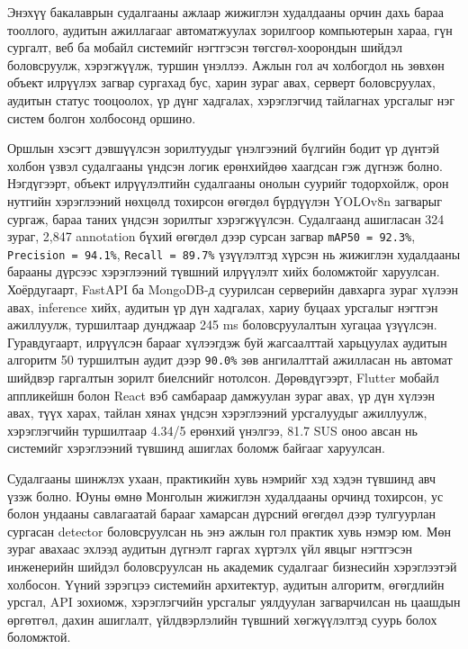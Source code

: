 
Энэхүү бакалаврын судалгааны ажлаар жижиглэн худалдааны орчин дахь бараа тооллого, аудитын ажиллагааг автоматжуулах зорилгоор компьютерын хараа, гүн сургалт, веб ба мобайл системийг нэгтгэсэн төгсгөл-хоорондын шийдэл боловсруулж, хэрэгжүүлж, туршин үнэллээ. Ажлын гол ач холбогдол нь зөвхөн объект илрүүлэх загвар сургахад бус, харин зураг авах, серверт боловсруулах, аудитын статус тооцоолох, үр дүнг хадгалах, хэрэглэгчид тайлагнах урсгалыг нэг систем болгон холбосонд оршино.

Оршлын хэсэгт дэвшүүлсэн зорилтуудыг үнэлгээний бүлгийн бодит үр дүнтэй холбон үзвэл судалгааны үндсэн логик ерөнхийдөө хаагдсан гэж дүгнэж болно. Нэгдүгээрт, объект илрүүлэлтийн судалгааны онолын суурийг тодорхойлж, орон нутгийн хэрэглээний нөхцөлд тохирсон өгөгдөл бүрдүүлэн YOLOv8n загварыг сургаж, бараа таних үндсэн зорилтыг хэрэгжүүлсэн. Судалгаанд ашигласан 324 зураг, 2,847 annotation бүхий өгөгдөл дээр сурсан загвар \texttt{mAP50 = 92.3\%}, \texttt{Precision = 94.1\%}, \texttt{Recall = 89.7\%} үзүүлэлтэд хүрсэн нь жижиглэн худалдааны барааны дүрсээс хэрэглээний түвшний илрүүлэлт хийх боломжтойг харуулсан. Хоёрдугаарт, FastAPI ба MongoDB-д суурилсан серверийн давхарга зураг хүлээн авах, inference хийх, аудитын үр дүн хадгалах, хариу буцаах урсгалыг нэгтгэн ажиллуулж, туршилтаар дунджаар 245 ms боловсруулалтын хугацаа үзүүлсэн. Гуравдугаарт, илрүүлсэн барааг хүлээгдэж буй жагсаалттай харьцуулах аудитын алгоритм 50 туршилтын аудит дээр \texttt{90.0\%} зөв ангилалттай ажилласан нь автомат шийдвэр гаргалтын зорилт биелснийг нотолсон. Дөрөвдүгээрт, Flutter мобайл аппликейшн болон React вэб самбараар дамжуулан зураг авах, үр дүн хүлээн авах, түүх харах, тайлан хянах үндсэн хэрэглээний урсгалуудыг ажиллуулж, хэрэглэгчийн туршилтаар 4.34/5 ерөнхий үнэлгээ, 81.7 SUS оноо авсан нь системийг хэрэглээний түвшинд ашиглах боломж байгааг харуулсан.

Судалгааны шинжлэх ухаан, практикийн хувь нэмрийг хэд хэдэн түвшинд авч үзэж болно. Юуны өмнө Монголын жижиглэн худалдааны орчинд тохирсон, ус болон ундааны савлагаатай барааг хамарсан дүрсний өгөгдөл дээр тулгуурлан сургасан detector боловсруулсан нь энэ ажлын гол практик хувь нэмэр юм. Мөн зураг авахаас эхлээд аудитын дүгнэлт гаргах хүртэлх үйл явцыг нэгтгэсэн инженерийн шийдэл боловсруулсан нь академик судалгааг бизнесийн хэрэглээтэй холбосон. Үүний зэрэгцээ системийн архитектур, аудитын алгоритм, өгөгдлийн урсгал, API зохиомж, хэрэглэгчийн урсгалыг уялдуулан загварчилсан нь цаашдын өргөтгөл, дахин ашиглалт, үйлдвэрлэлийн түвшний хөгжүүлэлтэд суурь болох боломжтой.

